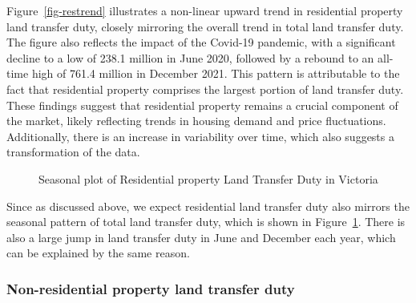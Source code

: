 \documentclass[
  11pt,
  a4paper,
]{article}
\begin{document}
Figure~\ref{fig-restrend} illustrates a non-linear upward trend in
residential property land transfer duty, closely mirroring the overall
trend in total land transfer duty. The figure also reflects the impact
of the Covid-19 pandemic, with a significant decline to a low of 238.1
million in June 2020, followed by a rebound to an all-time high of 761.4
million in December 2021. This pattern is attributable to the fact that
residential property comprises the largest portion of land transfer
duty. These findings suggest that residential property remains a crucial
component of the market, likely reflecting trends in housing demand and
price fluctuations. Additionally, there is an increase in variability
over time, which also suggests a transformation of the data.

\begin{figure}


\caption{\label{fig-resspattern}Seasonal plot of Residential property
Land Transfer Duty in Victoria}

\end{figure}%

Since as discussed above, we expect residential land transfer duty also
mirrors the seasonal pattern of total land transfer duty, which is shown
in Figure~\ref{fig-resspattern}. There is also a large jump in land
transfer duty in June and December each year, which can be explained by
the same reason.

\subsubsection{Non-residential property land transfer
duty}\label{non-residential-property-land-transfer-duty}
\end{document}
